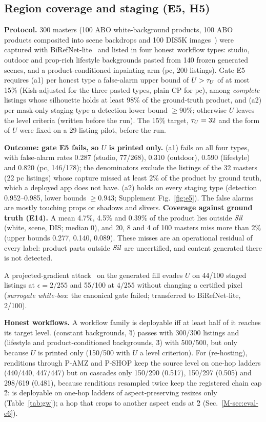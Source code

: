 \documentclass[10pt]{article}
\newcommand{\mainref}[1]{\ref{M-#1}}
\begin{document}
\subsection{Region coverage and staging (E5, H5)}
\textbf{Protocol.} 300 masters (100 ABO white-background products, 100 ABO products composited into scene backdrops and
100 DIS5K images~\cite{qin2022highly}) were captured with BiRefNet-lite~\cite{zheng2024bilateral} and listed in four
honest workflow types: studio, outdoor and prop-rich lifestyle backgrounds pasted from 140 frozen generated scenes,
and a product-conditioned inpainting arm (pc, 200 listings). Gate E5 requires (a1) per honest
type a false-alarm upper bound of $U>\tau_{U}$ of at most 15\% (Kish-adjusted for the three pasted types, plain CP for pc),
among \emph{complete} listings whose silhouette holds at least 98\% of the ground-truth product, and (a2) per mask-only
staging type a detection lower bound $\ge90\%$; otherwise $U$ leaves the level criteria (written before the run). The
15\% target, $\tau_{U}=32$ and the form of $U$ were fixed on a 29-listing pilot, before the run.

\textbf{Outcome: gate E5 fails, so $U$ is printed only.} (a1) fails on all four types, with false-alarm rates 0.287
(studio, 77/268), 0.310 (outdoor), 0.590 (lifestyle) and 0.820 (pc, 146/178); the denominators exclude the
listings of the 32 masters (22 pc listings) whose capture missed at least 2\% of the product by ground truth, which a
deployed app does not have. (a2) holds on every staging type (detection 0.952--0.985, lower bounds $\ge0.943$; Supplement
Fig.~\ref{fig:e5}). The false alarms are mostly touching props or shadows and slivers. \textbf{Coverage against ground truth (E14).} A mean 4.7\%, 4.5\% and 0.39\% of the product lies outside $\mathit{Sil}$ (white,
scene, DIS; median 0), and 20, 8 and 4 of 100 masters miss more than 2\% (upper bounds 0.277, 0.140, 0.089). These
misses are an operational residual of every label: product parts outside $\mathit{Sil}$ are uncertified, and content generated
there is not detected.

A projected-gradient attack~\cite{madry2018deep} on the generated fill evades $U$ on 44/100 staged listings at
$\epsilon=2/255$ and 55/100 at $4/255$ without changing a certified pixel (\emph{surrogate white-box}: the canonical gate failed; transferred to BiRefNet-lite, 2/100).

\textbf{Honest workflows.} A workflow family is deployable iff at least half of it reaches its target level.
 (constant backgrounds, \G{4}) passes with 300/300 listings and  (lifestyle and product-conditioned
backgrounds, \G{3}) with 500/500, but only because $U$ is printed only (150/500 with $U$ a level criterion). For 
(re-hosting), renditions through P-AMZ and P-SHOP keep the source level on one-hop ladders (440/440, 447/447) but on
cascades only 150/290 (0.517), 150/297 (0.505) and 298/619 (0.481), because renditions resampled twice keep the
registered chain cap \G{2}:  is deployable on one-hop ladders of aspect-preserving resizes only (Table~\ref{tab:gw}); a hop that
crops to another aspect ends at \G{2} (Sec.~\mainref{sec:eval-e6}).
\end{document}

